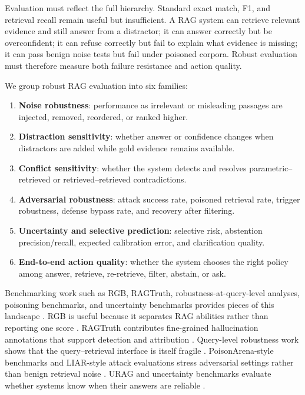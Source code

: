 







Evaluation must reflect the full hierarchy. Standard exact match, F1, and retrieval recall remain useful but insufficient. A RAG system can retrieve relevant evidence and still answer from a distractor; it can answer correctly but be overconfident; it can refuse correctly but fail to explain what evidence is missing; it can pass benign noise tests but fail under poisoned corpora. Robust evaluation must therefore measure both failure resistance and action quality.

We group robust RAG evaluation into six families:
\begin{enumerate}[leftmargin=*]
    \item \textbf{Noise robustness}: performance as irrelevant or misleading passages are injected, removed, reordered, or ranked higher.
    \item \textbf{Distraction sensitivity}: whether answer or confidence changes when distractors are added while gold evidence remains available.
    \item \textbf{Conflict sensitivity}: whether the system detects and resolves parametric--retrieved or retrieved--retrieved contradictions.
    \item \textbf{Adversarial robustness}: attack success rate, poisoned retrieval rate, trigger robustness, defense bypass rate, and recovery after filtering.
    \item \textbf{Uncertainty and selective prediction}: selective risk, abstention precision/recall, expected calibration error, and clarification quality.
    \item \textbf{End-to-end action quality}: whether the system chooses the right policy among answer, retrieve, re-retrieve, filter, abstain, or ask.
\end{enumerate}
Benchmarking work such as RGB, RAGTruth, robustness-at-query-level analyses, poisoning benchmarks, and uncertainty benchmarks provides pieces of this landscape \citep{rgb2023,ragTruth2024,queryRobustness2025}. RGB is useful because it separates RAG abilities rather than reporting one score \citep{rgb2023}. RAGTruth contributes fine-grained hallucination annotations that support detection and attribution \citep{ragTruth2024}. Query-level robustness work shows that the query--retrieval interface is itself fragile \citep{queryRobustness2025}. PoisonArena-style benchmarks and LIAR-style attack evaluations stress adversarial settings rather than benign retrieval noise \citep{rrag023,rrag035}. URAG and uncertainty benchmarks evaluate whether systems know when their answers are reliable \citep{rrag001,rrag093}.

